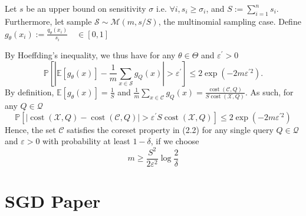 \documentclass{article}
\theoremstyle{definition}
\begin{document}
Let $s$ be an upper bound on sensitivity $\sigma$ i.e. $\forall i, s_i \geq \sigma_i$, and $S := \sum_{i=1}^n s_i$. Furthermore, let sample  $\mathcal S \sim \mathcal M(m, s/S)$, the multinomial sampling case. Define $g_\theta(x_i) := \frac{q_\theta(x_i)}{s_i}  \quad \in[0,1]$

By Hoeffding's inequality, we thus have for any $\theta \in \Theta$ and $\varepsilon^{\prime}>0$
$$
\mathbb{P}\left[\left|\mathbb{E}\left[g_{\theta}(x)\right]-\frac{1}{m} \sum_{x \in \mathcal{S}} g_{Q}(x)\right|>\varepsilon^{\prime}\right] \leq 2 \exp \left(-2 m \varepsilon^{\prime 2}\right) .
$$
By definition, $\mathbb{E}\left[g_{\theta}(x)\right]=\frac{1}{S}$ and $\frac{1}{m} \sum_{x \in \mathcal{C}} g_{Q}(x)=\frac{\operatorname{cost}(\mathcal{C}, Q)}{S \operatorname{cost}(\mathcal{X}, Q)}$. As such, for any $Q \in \mathcal{Q}$
$$
\mathbb{P}\left[|\operatorname{cost}(\mathcal{X}, Q)-\operatorname{cost}(\mathcal{C}, Q)|>\varepsilon^{\prime} S \operatorname{cost}(\mathcal{X}, Q)\right] \leq 2 \exp \left(-2 m \varepsilon^{\prime 2}\right)
$$
Hence, the set $\mathcal{C}$ satisfies the coreset property in (2.2) for any single query $Q \in \mathcal{Q}$ and $\varepsilon>0$ with probability at least $1-\delta$, if we choose
$$
m \geq \frac{S^{2}}{2 \varepsilon^{2}} \log \frac{2}{\delta}
$$




\section{SGD Paper}
	
	
	
	\vfill
	
	
	\printbibliography
%	 
%	 
	
\end{document}
